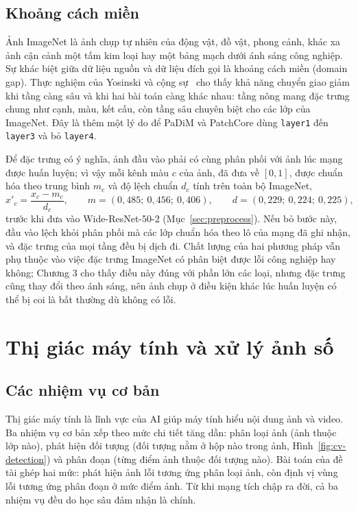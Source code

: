 \subsection{Khoảng cách miền}

Ảnh ImageNet là ảnh chụp tự nhiên của động vật, đồ vật, phong cảnh, khác xa ảnh cận cảnh một tấm kim loại hay một
bảng mạch dưới ánh sáng công nghiệp. Sự khác biệt giữa dữ liệu nguồn và dữ liệu đích gọi là khoảng cách miền (domain
gap). Thực nghiệm của Yosinski và cộng sự~\cite{yosinskiHowTransferableAre2014} cho thấy khả năng chuyển giao giảm khi
tầng càng sâu và khi hai bài toán càng khác nhau: tầng nông mang đặc trưng chung như cạnh, màu, kết cấu, còn tầng sâu
chuyên biệt cho các lớp của ImageNet. Đây là thêm một lý do để PaDiM và PatchCore dùng \texttt{layer1} đến
\texttt{layer3} và bỏ \texttt{layer4}.

Để đặc trưng có ý nghĩa, ảnh đầu vào phải có cùng phân phối với ảnh lúc mạng được huấn luyện; vì vậy mỗi kênh màu
$c$ của ảnh, đã đưa về $[0,1]$, được chuẩn hóa theo trung bình $m_c$ và độ lệch chuẩn $d_c$ tính trên toàn bộ ImageNet,
\begin{equation}
  x'_c = \frac{x_c - m_c}{d_c}, \qquad m = (0{,}485;\ 0{,}456;\ 0{,}406), \qquad d = (0{,}229;\ 0{,}224;\ 0{,}225),
  \label{eq:imagenet-norm}
\end{equation}
trước khi đưa vào Wide-ResNet-50-2 (Mục~\ref{sec:preprocess}). Nếu bỏ bước này, đầu vào lệch khỏi phân phối mà các
lớp chuẩn hóa theo lô của mạng đã ghi nhận, và đặc trưng của mọi tầng đều bị dịch đi. Chất
lượng của hai phương pháp vẫn phụ thuộc vào việc đặc trưng ImageNet có phân biệt được lỗi công nghiệp hay không;
Chương 3 cho thấy điều này đúng với phần lớn các loại, nhưng đặc trưng cũng thay đổi theo ánh sáng, nên ảnh chụp ở
điều kiện khác lúc huấn luyện có thể bị coi là bất thường dù không có lỗi.

\section{Thị giác máy tính và xử lý ảnh số}

\subsection{Các nhiệm vụ cơ bản}

Thị giác máy tính là lĩnh vực của AI giúp máy tính hiểu nội dung ảnh và video. Ba nhiệm vụ cơ bản xếp theo mức chi
tiết tăng dần: phân loại ảnh (ảnh thuộc lớp nào), phát hiện đối tượng (đối tượng nằm ở hộp nào trong ảnh,
Hình~\ref{fig:cv-detection}) và phân đoạn (từng điểm ảnh thuộc đối tượng nào). Bài toán của đề tài ghép hai mức:
phát hiện ảnh lỗi tương ứng phân loại ảnh, còn định vị vùng lỗi tương ứng phân đoạn ở mức điểm ảnh. Từ khi mạng tích
chập ra đời, cả ba nhiệm vụ đều do học sâu đảm nhận là chính.

